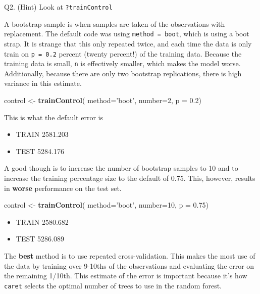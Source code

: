 \documentclass[]{book}
\newenvironment{Shaded}{\begin{snugshade}}{\end{snugshade}}
\newcommand{\DataTypeTok}[1]{\textcolor[rgb]{0.13,0.29,0.53}{#1}}
\newcommand{\DecValTok}[1]{\textcolor[rgb]{0.00,0.00,0.81}{#1}}
\newcommand{\FloatTok}[1]{\textcolor[rgb]{0.00,0.00,0.81}{#1}}
\newcommand{\KeywordTok}[1]{\textcolor[rgb]{0.13,0.29,0.53}{\textbf{#1}}}
\newcommand{\NormalTok}[1]{#1}
\newcommand{\StringTok}[1]{\textcolor[rgb]{0.31,0.60,0.02}{#1}}
\providecommand{\tightlist}{%
  \setlength{\itemsep}{0pt}\setlength{\parskip}{0pt}}
\begin{document}
Q2. (Hint) Look at \texttt{?trainControl}

A bootstrap sample is when samples are taken of the observations with replacement. The default code was using \texttt{method\ =\ boot}, which is using a boot strap. It is strange that this only repeated twice, and each time the data is only train on \texttt{p\ =\ 0.2} percent (twenty percent!) of the training data. Because the training data is small, \texttt{n} is effectively smaller, which makes the model worse. Additionally, because there are only two bootstrap replications, there is high variance in this estimate.

\begin{Shaded}
\begin{Highlighting}[]
\NormalTok{control <-}\StringTok{ }\KeywordTok{trainControl}\NormalTok{(}
  \DataTypeTok{method=}\StringTok{'boot'}\NormalTok{, }
  \DataTypeTok{number=}\DecValTok{2}\NormalTok{, }
  \DataTypeTok{p =} \FloatTok{0.2}\NormalTok{)}
\end{Highlighting}
\end{Shaded}

This is what the default error is

\begin{itemize}
\tightlist
\item
  TRAIN 2581.203
\item
  TEST 5284.176
\end{itemize}

A good though is to increase the number of bootstrap samples to 10 and to increase the training percentage size to the default of 0.75. This, however, results in \textbf{worse} performance on the test set.

\begin{Shaded}
\begin{Highlighting}[]
\NormalTok{control <-}\StringTok{ }\KeywordTok{trainControl}\NormalTok{(}
  \DataTypeTok{method=}\StringTok{'boot'}\NormalTok{, }
  \DataTypeTok{number=}\DecValTok{10}\NormalTok{, }
  \DataTypeTok{p =} \FloatTok{0.75}\NormalTok{)}
\end{Highlighting}
\end{Shaded}

\begin{itemize}
\tightlist
\item
  TRAIN 2580.682
\item
  TEST 5286.089
\end{itemize}

The \textbf{best} method is to use repeated cross-validation. This makes the most use of the data by training over 9-10ths of the observations and evaluating the error on the remaining 1/10th. This estimate of the error is important because it's how \texttt{caret} selects the optimal number of trees to use in the random forest.
\end{document}
